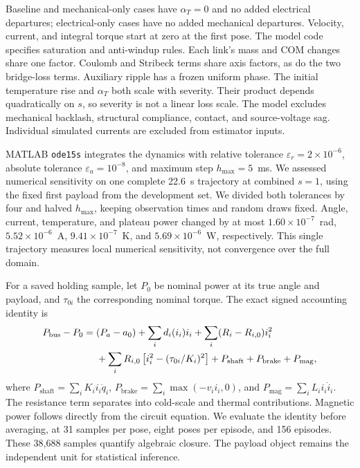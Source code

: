 \documentclass[12pt,a4paper]{article}
\begin{document}
Baseline and mechanical-only cases have $\alpha_T=0$ and no added electrical
departures; electrical-only cases have no added mechanical departures.
Velocity, current, and integral torque start at zero at the first pose.
The model code specifies saturation and anti-windup rules.
Each link's mass and COM changes share one factor. Coulomb and Stribeck
terms share axis factors, as do the two bridge-loss terms. Auxiliary ripple
has a frozen uniform phase. The initial temperature rise and
$\alpha_T$ both scale with severity. Their product depends quadratically on
$s$, so severity is not a linear loss scale. The model excludes
mechanical backlash, structural compliance, contact, and source-voltage sag.
Individual simulated currents are excluded from estimator inputs.

MATLAB \texttt{ode15s} integrates the dynamics with relative tolerance
$\varepsilon_r=2\times10^{-6}$, absolute tolerance
$\varepsilon_a=10^{-8}$, and maximum step $h_{\max}=5$~ms. We assessed
numerical sensitivity on one complete 22.6~s trajectory at combined
$s=1$, using the fixed first payload from the development set.
We divided both tolerances by four and halved $h_{\max}$, keeping
observation times and random draws fixed. Angle, current, temperature,
and plateau power changed by at most $1.60\times10^{-7}$~rad,
$5.52\times10^{-6}$~A, $9.41\times10^{-7}$~K, and
$5.69\times10^{-6}$~W, respectively. This single trajectory measures
local numerical sensitivity, not convergence over the full domain.

For a saved holding sample, let $P_0$ be nominal power at its true angle
and payload, and $\tau_{0i}$ the corresponding nominal torque. The exact
signed accounting identity is
\begin{align}
 P_{\mathrm{bus}}-P_0={}&(P_a-a_0)+\sum_i d_i(i_i)i_i
 +\sum_i(R_i-R_{i,0})i_i^2 \notag\\
 &+\sum_iR_{i,0}\left[i_i^2-(\tau_{0i}/K_i)^2\right]
 +P_{\mathrm{shaft}}+P_{\mathrm{brake}}+P_{\mathrm{mag}},
 \label{eq:power_ledger}
\end{align}
where $P_{\mathrm{shaft}}=\sum_iK_i i_i\dot q_i$,
$P_{\mathrm{brake}}=\sum_i\max(-v_i i_i,0)$, and
$P_{\mathrm{mag}}=\sum_iL_i i_i\dot i_i$.
The resistance term separates into cold-scale and thermal contributions.
Magnetic power follows directly from the circuit equation. We evaluate the
identity before averaging, at 31 samples per pose, eight poses per episode,
and 156 episodes. These 38,688 samples quantify algebraic closure. The
payload object remains the independent unit for statistical inference.
\end{document}
